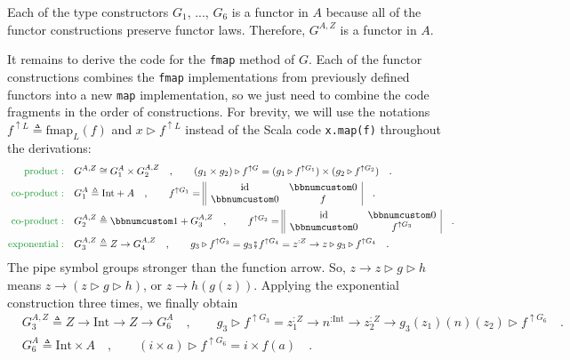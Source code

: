 Each of the type constructors $G_{1}$, ..., $G_{6}$ is a functor
in $A$ because all of the functor constructions preserve functor
laws. Therefore, $G^{A,Z}$ is a functor in $A$. 

It remains to derive the code for the \lstinline!fmap! method of
$G$. Each of the functor constructions combines the \lstinline!fmap!
implementations from previously defined functors into a new \lstinline!map!
implementation, so we just need to combine the code fragments in the
order of constructions. For brevity, we will use the notations $f^{\uparrow L}\triangleq\text{fmap}_{L}(f)$
and $x\triangleright f^{\uparrow L}$ instead of the Scala code \lstinline!x.map(f)!
throughout the derivations:
\begin{align*}
{\color{greenunder}\text{product}:}\quad & G^{A,Z}\cong G_{1}^{A}\times G_{2}^{A,Z}\quad,\quad\quad(g_{1}\times g_{2})\triangleright f^{\uparrow G}=(g_{1}\triangleright f^{\uparrow G_{1}})\times(g_{2}\triangleright f^{\uparrow G_{2}})\quad.\\
{\color{greenunder}\text{co-product}:}\quad & G_{1}^{A}\triangleq\text{Int}+A\quad,\quad\quad f^{\uparrow G_{1}}=\begin{array}{||cc|}
\text{id} & \bbnum 0\\
\bbnum 0 & f
\end{array}\quad.\\
{\color{greenunder}\text{co-product}:}\quad & G_{2}^{A,Z}\triangleq\bbnum 1+G_{3}^{A,Z}\quad,\quad\quad f^{\uparrow G_{2}}=\begin{array}{||cc|}
\text{id} & \bbnum 0\\
\bbnum 0 & f^{\uparrow G_{3}}
\end{array}\quad.\\
{\color{greenunder}\text{exponential}:}\quad & G_{3}^{A,Z}\triangleq Z\rightarrow G_{4}^{A,Z}\quad,\quad\quad g_{3}\triangleright f^{\uparrow G_{3}}=g_{3}\bef f^{\uparrow G_{4}}=z^{:Z}\rightarrow z\triangleright g_{3}\triangleright f^{\uparrow G_{4}}\quad.
\end{align*}
The pipe symbol groups stronger than the function arrow.
So, $z\rightarrow z\triangleright g\triangleright h$ means $z\rightarrow(z\triangleright g\triangleright h)$,
or $z\rightarrow h(g(z))$. Applying the exponential  construction
three times, we finally obtain
\begin{align*}
 & G_{3}^{A,Z}\triangleq Z\rightarrow\text{Int}\rightarrow Z\rightarrow G_{6}^{A}\quad,\quad\quad g_{3}\triangleright f^{\uparrow G_{3}}=z_{1}^{:Z}\rightarrow n^{:\text{Int}}\rightarrow z_{2}^{:Z}\rightarrow g_{3}(z_{1})(n)(z_{2})\triangleright f^{\uparrow G_{6}}\quad.\\
 & G_{6}^{A}\triangleq\text{Int}\times A\quad,\quad\quad(i\times a)\triangleright f^{\uparrow G_{6}}=i\times f(a)\quad.
\end{align*}
